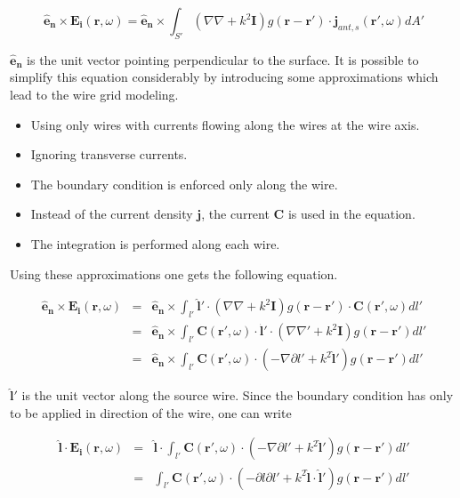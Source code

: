 \documentclass[a4paper,11pt]{thesis}
\begin{document}
\begin{equation}
   \mathbf{\hat{e}_n} \times \mathbf{E_i}(\mathbf{r},\omega)= \mathbf{\hat{e}_n}\times \int_{S'} \left(  \nabla  \nabla   + k^2 \mathbf{I} \right) g(\mathbf{r}-\mathbf{r'})\cdot \mathbf{j}_{ant,s}(\mathbf{r'},\omega) dA'\label{boundary_E_vacuum}
\end{equation}

$\mathbf{\hat{e}_n}$ is the unit vector pointing perpendicular to the surface. It is possible to simplify this equation considerably by introducing some approximations which lead to the wire grid modeling.

\begin{itemize}
    \item Using only wires with currents flowing along the wires at the wire axis.
    \item Ignoring transverse currents.
    \item The boundary condition is enforced only along the wire.
\item Instead of the current density $\mathbf{j}$, the current $\mathbf{C}$ is used in the equation.
\item The integration is performed along each wire.
\end{itemize}

Using these approximations one gets the following equation.

\begin{eqnarray}
   \mathbf{\hat{e}_n} \times \mathbf{E_i}(\mathbf{r},\omega)&=& \mathbf{\hat{e}_n}\times \int_{l'}   \mathbf{\hat{l}'} \cdot \left(  \nabla  \nabla   + k^2 \mathbf{I} \right) g(\mathbf{r}-\mathbf{r'})\cdot \mathbf{C}(\mathbf{r'},\omega) dl'\label{efie1}\\
&=& \mathbf{\hat{e}_n}\times \int_{l'}   \mathbf{C}(\mathbf{r'},\omega)\cdot \mathbf{\hat{l}'} \cdot \left(  \nabla  \nabla'   + k^2 \mathbf{I} \right) g(\mathbf{r}-\mathbf{r'}) dl'\\
&=& \mathbf{\hat{e}_n}\times \int_{l'}   \mathbf{C}(\mathbf{r'},\omega)\cdot \left(  -\nabla  \partial l'   + k^2  \mathbf{\hat{l}'} \right) g(\mathbf{r}-\mathbf{r'}) dl'
\end{eqnarray}

$\mathbf{\hat{l}'}$ is the unit vector along the source wire. Since the boundary condition has only to be applied in direction of the wire, one can write

\begin{eqnarray}
  \mathbf{\hat{l}} \cdot \mathbf{E_i}(\mathbf{r},\omega) &=& \mathbf{\hat{l}} \cdot \int_{l'}   \mathbf{C}(\mathbf{r'},\omega)\cdot \left(  -\nabla  \partial l'   + k^2  \mathbf{\hat{l}'} \right) g(\mathbf{r}-\mathbf{r'}) dl'\\
 &=&  \int_{l'}   \mathbf{C}(\mathbf{r'},\omega)\cdot \left(  -\partial l  \partial l'   + k^2  \mathbf{\hat{l}} \cdot \mathbf{\hat{l}'} \right) g(\mathbf{r}-\mathbf{r'}) dl'\label{eq:efie_curr_rep_wire}
\end{eqnarray}
\end{document}

